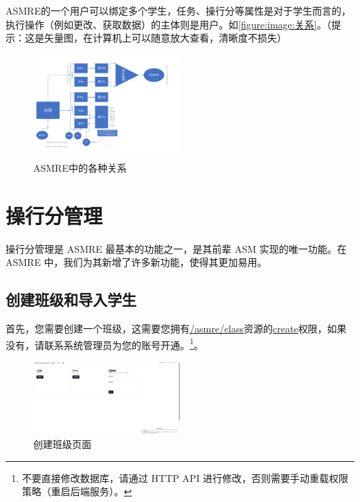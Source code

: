 \documentclass[lang=cn]{elegantpaper}
\begin{document}
    ASMRE的一个用户可以绑定多个学生，任务、操行分等属性是对于学生而言的，执行操作（例如更改、获取数据）的主体则是用户。如\autoref{figure:image:关系}。（提示：这是矢量图，在计算机上可以随意放大查看，清晰度不损失）

    \begin{figure}[htbp]
        \centering
        \includegraphics[width=0.5\textwidth]{./figure/images/asmre-bindings.pdf}
        \caption{ASMRE中的各种关系}\label{figure:image:关系}
    \end{figure}

\section{操行分管理}
    \label{section:操行分管理}

    操行分管理是 ASMRE 最基本的功能之一，是其前辈 ASM 实现的唯一功能。在 ASMRE 中，我们为其新增了许多新功能，使得其更加易用。

    \subsection{创建班级和导入学生}
        首先，您需要创建一个班级，这需要您拥有\uline{/asmre/class}资源的\uline{create}权限，如果没有，请联系系统管理员为您的账号开通。\footnote{不要直接修改数据库，请通过 HTTP API 进行修改，否则需要手动重载权限策略（重启后端服务）。}。

        \begin{figure}
            \centering
            \includegraphics[width=0.5\textwidth]{figure/images/create-class.png}
            \caption{创建班级页面}
            \label{figure:image:创建班级页面}
        \end{figure}
\end{document}
